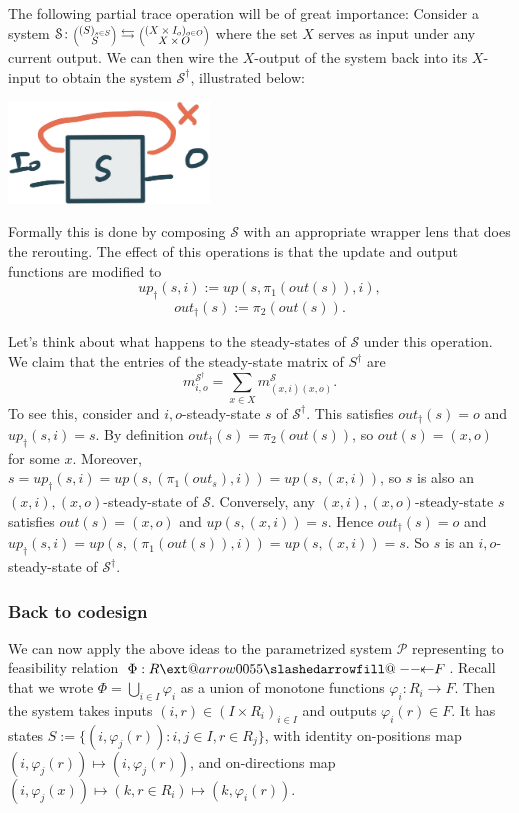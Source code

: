 \documentclass[12pt, a4paper]{article}
\makeatletter
\theoremstyle{definition}
\theoremstyle{plain}
\theoremstyle{plain}
\theoremstyle{plain}
\theoremstyle{plain}
\theoremstyle{plain}
\theoremstyle{remark}
\theoremstyle{remark}
\newcommand{\mc}[1]{\mathcal{#1}}
\newcommand{\lens}[2]{\scaleobj{0.6}{\begin{pmatrix} \scaleobj{1.3}{{#1}} \\ \scaleobj{1.3}{{#2}} \end{pmatrix}}}
\def\slashedarrowfill@#1#2#3#4#5{%
	$\m@th\thickmuskip0mu\medmuskip\thickmuskip\thinmuskip\thickmuskip
	\relax#5#1\mkern-7mu%
	\cleaders\hbox{$#5\mkern-2mu#2\mkern-2mu$}\hfill
	\mathclap{#3}\mathclap{#2}%
	\cleaders\hbox{$#5\mkern-2mu#2\mkern-2mu$}\hfill
	\mkern-7mu#4$%
}
\def\leftslashedarrowfill@{%
	\slashedarrowfill@\relbar\relbar\mapstochar\leftarrow}
\newcommand\xslashedleftarrow[2][]{%
	\ext@arrow 0055{\leftslashedarrowfill@}{#1}{#2}}
\newcommand{\bprof}{\xslashedleftarrow{}}
\makeatother
\begin{document}
The following partial trace operation will be of great importance: Consider a system $\mc{S} \colon \lens{(S)_{s \in S}}{S} \leftrightarrows \lens{(X \times I_o)_{o \in O} }{X \times O}$ where the set $X$ serves as input under any current output. We can then wire the $X$-output of the system back into its $X$-input to obtain the system $\mc{S}^\dagger$, illustrated below:
\begin{center}
\includegraphics[width = 0.4\textwidth]{trace.jpg}
\end{center}
Formally this is done by composing $\mc{S}$ with an appropriate wrapper lens that does the rerouting. The effect of this operations is that the update and output functions are modified to 
$$up_\dagger(s, i) := up(s,\pi_1(out(s)),i),$$ 
$$out_\dagger(s) := \pi_2(out(s)).$$

Let's think about what happens to the steady-states of $\mc{S}$ under this operation. We claim that the entries of the steady-state matrix of $S^\dagger$ are 
$$m^{\mc{S}^\dagger}_{i,o} = \sum_{x \in X} m^{\mc{S}}_{(x,i)(x,o)}.$$
To see this, consider and $i,o$-steady-state $s$ of $\mc{S}^\dagger$. This satisfies $out_\dagger(s) = o$ and $up_\dagger(s,i) = s$. By definition $out_\dagger(s) = \pi_2(out(s))$, so $out(s) = (x,o)$ for some $x$. Moreover, $s = up_\dagger(s,i) = up(s,(\pi_1(out_s),i)) = up(s,(x,i))$, so $s$ is also an $(x,i),(x,o)$-steady-state of $\mc{S}$. Conversely, any $(x,i),(x,o)$-steady-state $s$ satisfies $out(s) = (x,o)$ and $up(s,(x,i)) = s$. Hence $out_\dagger(s) = o$ and $up_\dagger(s,i) = up(s,(\pi_1(out(s)),i)) = up(s,(x,i)) = s$. So $s$ is an $i,o$-steady-state of $\mc{S}^\dagger$. 

\subsubsection{Back to codesign}
We can now apply the above ideas to the parametrized system $\mc{P}$ representing to feasibility relation $\Phi: R \bprof F$. Recall that we wrote $\Phi = \bigcup_{i \in I} \varphi_i$ as a union of monotone functions $\varphi_i \colon R_i \rightarrow F$. Then the system takes inputs $(i, r) \in (I \times R_i)_{i \in I}$ and outputs $\varphi_i(r) \in F$. It has states $S := \{ (i,\varphi_j(r)) : i,j \in I, r \in R_j \}$, with identity on-positions map $(i,\varphi_j(r)) \mapsto (i,\varphi_j(r))$, and on-directions map $(i,\varphi_j(x))\mapsto (k,r \in R_i) \mapsto (k,\varphi_i(r))$.
\end{document}
